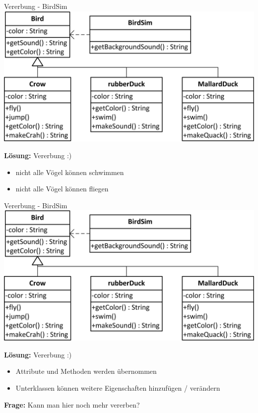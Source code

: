 \documentclass[18pt]{beamer}
\begin{document}

\begin{frame}{Vererbung - BirdSim}
	\includegraphics[scale=1]{bilder/uml/uml2.jpg}
	
	\textbf{Lösung:} Vererbung :)
	\begin{itemize}
		\item nicht alle Vögel können schwimmen
		\item nicht alle Vögel können fliegen
	\end{itemize}
\end{frame}


\begin{frame}{Vererbung - BirdSim}
	\includegraphics[scale=1]{bilder/uml/uml2.jpg}
	
	\textbf{Lösung:} Vererbung :)
	\begin{itemize}
		\item Attribute und Methoden werden übernommen
		\item Unterklassen können weitere Eigenschaften hinzufügen / verändern
	\end{itemize}\pause

	\textbf{Frage:} Kann man hier noch mehr vererben?
\end{frame}
\end{document}
